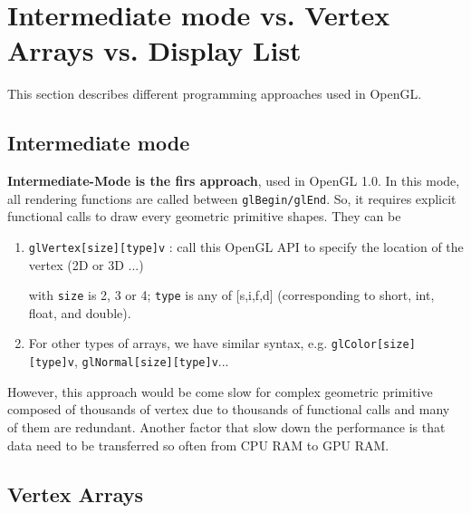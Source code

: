 \section{Intermediate mode vs. Vertex Arrays vs. Display List}
\label{sec:interm-mode-vs}

This section describes different programming approaches used in
OpenGL. 

\subsection{Intermediate mode}
\label{sec:intermediate-mode-1}

{\bf Intermediate-Mode is the firs approach}, used in OpenGL 1.0. In
this mode, all rendering functions are called between
\verb!glBegin/glEnd!. So, it requires explicit functional calls to
draw every geometric primitive shapes. They can be

\begin{enumerate}
\item \verb!glVertex[size][type]v! : call this OpenGL API to specify
  the location of the vertex (2D or 3D ...)

  with \verb!size! is 2, 3 or 4; \verb!type! is any of [s,i,f,d]
  (corresponding to short, int, float, and double). 

\item For other types of arrays, we have similar syntax,
  e.g. \verb!glColor[size][type]v!, \verb!glNormal[size][type]v!...
\end{enumerate}

However, this approach would be come slow for complex geometric
primitive composed of thousands of vertex due to thousands of
functional calls and many of them are redundant. Another factor that
slow down the performance is that data need to be transferred so often
from CPU RAM to GPU RAM. 

\subsection{Vertex Arrays}
\label{sec:vertex-arrays}

